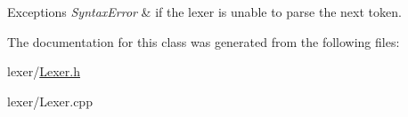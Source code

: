 \begin{DoxyExceptions}{Exceptions}
{\em Syntax\+Error} & if the lexer is unable to parse the next token. \\
\hline
\end{DoxyExceptions}


The documentation for this class was generated from the following files\+:\begin{DoxyCompactItemize}
\item 
lexer/\hyperlink{Lexer_8h}{Lexer.\+h}\item 
lexer/Lexer.\+cpp\end{DoxyCompactItemize}
